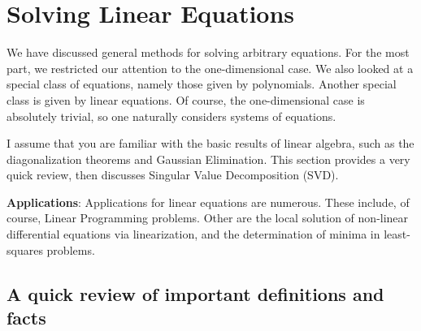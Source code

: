 \chapter{Solving Linear Equations}

We have discussed general methods for solving arbitrary equations. For the most part, we restricted our attention to the one-dimensional case. We also looked at a special class of equations, namely those given by polynomials. Another special class is given by linear equations. Of course, the one-dimensional case is absolutely trivial, so one naturally considers systems of equations. 

I assume that you are familiar with the basic results of linear algebra, such as the diagonalization theorems and Gaussian Elimination. This section provides a very quick review, then discusses Singular Value Decomposition (SVD).

\medskip
\noindent \textbf{Applications}: Applications for linear equations are numerous. These include, of course, Linear Programming problems. Other are the local solution of non-linear differential equations via linearization, and the determination of minima in least-squares problems. 

\newpage

\section{A quick review of important definitions and facts}

